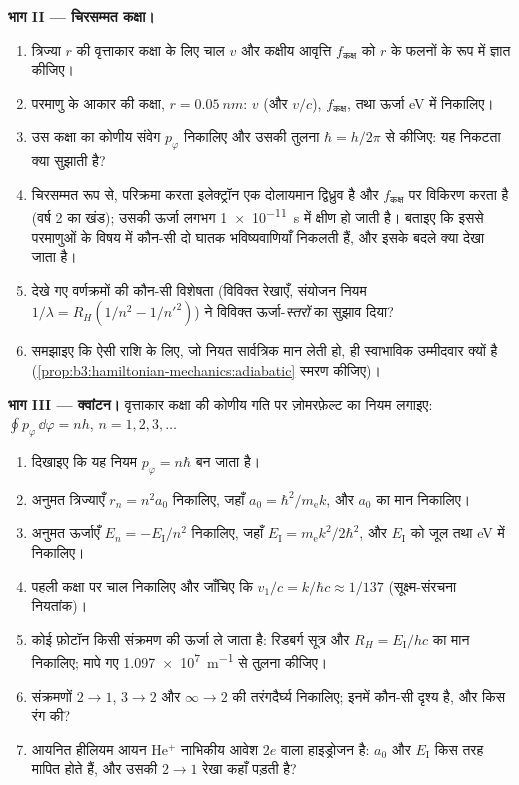 \begin{problem}
\medskip\noindent\textbf{भाग II --- चिरसम्मत कक्षा।}
\begin{enumerate}[resume]
  \item त्रिज्या $r$ की वृत्ताकार कक्षा के लिए चाल $v$ और कक्षीय
        आवृत्ति $f_{\text{कक्ष}}$ को $r$ के फलनों के रूप में ज्ञात कीजिए।
  \item परमाणु के आकार की कक्षा, $r = \qty{0.05}{nm}$: $v$
        (और $v/c$), $f_{\text{कक्ष}}$, तथा ऊर्जा eV में निकालिए।
  \item उस कक्षा का कोणीय संवेग $p_\varphi$ निकालिए और उसकी तुलना
        $\hbar = h/2\pi$ से कीजिए: यह निकटता क्या सुझाती है?
  \item चिरसम्मत रूप से, परिक्रमा करता इलेक्ट्रॉन एक दोलायमान
        द्विध्रुव है और $f_{\text{कक्ष}}$ पर विकिरण करता है (वर्ष 2 का
        खंड); उसकी ऊर्जा लगभग \qty{1e-11}{s} में क्षीण हो जाती है।
        बताइए कि इससे परमाणुओं के विषय में कौन-सी दो घातक भविष्यवाणियाँ
        निकलती हैं, और इसके बदले क्या देखा जाता है।
  \item देखे गए वर्णक्रमों की कौन-सी विशेषता (विविक्त रेखाएँ, संयोजन
        नियम $1/\lambda = R_H(1/n^2 - 1/n'^2)$) ने विविक्त ऊर्जा-\emph{स्तरों}
        का सुझाव दिया?
  \item समझाइए कि ऐसी राशि के लिए, जो नियत सार्वत्रिक मान लेती हो,
        \emph{} ही स्वाभाविक उम्मीदवार क्यों है
        (\cref{prop:b3:hamiltonian-mechanics:adiabatic} स्मरण कीजिए)।
\end{enumerate}

\medskip\noindent\textbf{भाग III --- क्वांटन।}
वृत्ताकार कक्षा की कोणीय गति पर ज़ोमरफ़ेल्ट का नियम लगाइए:
$\oint p_\varphi\,\dd\varphi = nh$, $n = 1, 2, 3, \dots$
\begin{enumerate}[resume]
  \item दिखाइए कि यह नियम $p_\varphi = n\hbar$ बन जाता है।
  \item अनुमत त्रिज्याएँ $r_n = n^2a_0$ निकालिए, जहाँ $a_0 =
        \hbar^2/m_{\text{e}}k$, और $a_0$ का मान निकालिए।
  \item अनुमत ऊर्जाएँ $E_n = -E_{\text{I}}/n^2$ निकालिए, जहाँ
        $E_{\text{I}} = m_{\text{e}}k^2/2\hbar^2$, और
        $E_{\text{I}}$ को जूल तथा eV में निकालिए।
  \item पहली कक्षा पर चाल निकालिए और जाँचिए कि $v_1/c =
        k/\hbar c \approx 1/137$ (सूक्ष्म-संरचना नियतांक)।
  \item कोई फ़ोटॉन किसी संक्रमण की ऊर्जा ले जाता है: रिडबर्ग सूत्र और
        $R_H = E_{\text{I}}/hc$ का मान निकालिए;
        मापे गए \qty{1.097e7}{m^{-1}} से तुलना कीजिए।
  \item संक्रमणों $2 \to 1$,
        $3 \to 2$ और $\infty \to 2$ की तरंगदैर्घ्य निकालिए; इनमें
        कौन-सी दृश्य है, और किस रंग की?
  \item आयनित हीलियम आयन He$^+$ नाभिकीय आवेश
        $2e$ वाला हाइड्रोजन है: $a_0$ और $E_{\text{I}}$ किस तरह
        मापित होते हैं, और उसकी $2 \to 1$ रेखा कहाँ पड़ती है?
\end{enumerate}


\end{problem}

